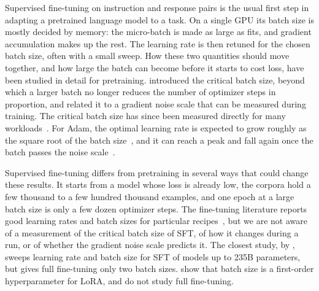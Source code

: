 \documentclass[10pt]{article}
\begin{document}
Supervised fine-tuning on instruction and response pairs is the usual first step in adapting a pretrained language model to a task. On a single GPU its batch size is mostly decided by memory: the micro-batch is made as large as fits, and gradient accumulation makes up the rest. The learning rate is then retuned for the chosen batch size, often with a small sweep. How these two quantities should move together, and how large the batch can become before it starts to cost loss, have been studied in detail for pretraining. \citet{mccandlish2018} introduced the critical batch size, beyond which a larger batch no longer reduces the number of optimizer steps in proportion, and related it to a gradient noise scale that can be measured during training. The critical batch size has since been measured directly for many workloads~\citep{shallue2019,zhang2025cbs,merrill2025}. For Adam, the optimal learning rate is expected to grow roughly as the square root of the batch size~\citep{malladi2022}, and it can reach a peak and fall again once the batch passes the noise scale~\citep{li2024surge}.

Supervised fine-tuning differs from pretraining in several ways that could change these results. It starts from a model whose loss is already low, the corpora hold a few thousand to a few hundred thousand examples, and one epoch at a large batch size is only a few dozen optimizer steps. The fine-tuning literature reports good learning rates and batch sizes for particular recipes~\citep{oneill2026,pareja2024,lee2026}, but we are not aware of a measurement of the critical batch size of SFT, of how it changes during a run, or of whether the gradient noise scale predicts it. The closest study, by \citet{oneill2026}, sweeps learning rate and batch size for SFT of models up to 235B parameters, but gives full fine-tuning only two batch sizes. \citet{lee2026} show that batch size is a first-order hyperparameter for LoRA, and do not study full fine-tuning.
\end{document}
